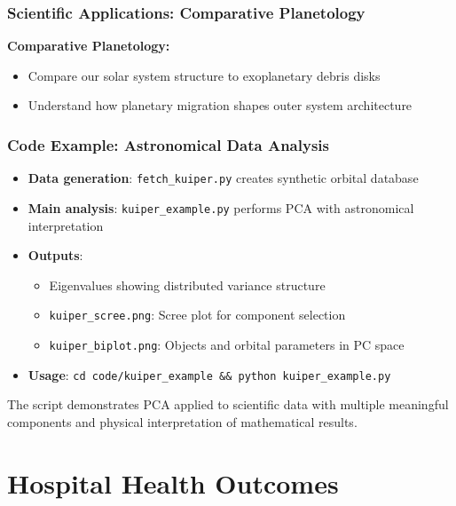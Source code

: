 \documentclass[aspectratio=169]{beamer}
\begin{document}
\begin{frame}
    \frametitle{Scientific Applications: Comparative Planetology}
    \textbf{Comparative Planetology:}
    \begin{itemize}
        \item Compare our solar system structure to exoplanetary debris disks \pause
        \item Understand how planetary migration shapes outer system architecture \pause
    \end{itemize}
\end{frame}

\begin{frame}
    \frametitle{Code Example: Astronomical Data Analysis}
    \begin{itemize}
        \item \textbf{Data generation}: \texttt{fetch\_kuiper.py} creates synthetic orbital database \pause
        \item \textbf{Main analysis}: \texttt{kuiper\_example.py} performs PCA with astronomical interpretation \pause
        \item \textbf{Outputs}:
              \begin{itemize}
                  \item Eigenvalues showing distributed variance structure \pause
                  \item \texttt{kuiper\_scree.png}: Scree plot for component selection \pause
                  \item \texttt{kuiper\_biplot.png}: Objects and orbital parameters in PC space \pause
              \end{itemize}
        \item \textbf{Usage}: \texttt{cd code/kuiper\_example \&\& python kuiper\_example.py} \pause
    \end{itemize}
    \vspace{6pt}
    The script demonstrates PCA applied to scientific data with multiple meaningful components and physical interpretation of mathematical results.
\end{frame}

\section{Hospital Health Outcomes}
\end{document}
